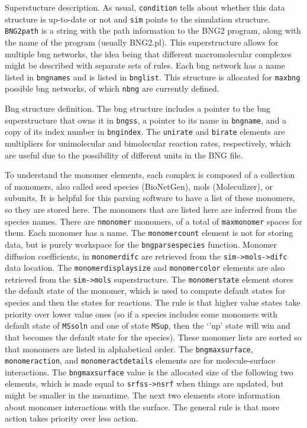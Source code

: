 \documentclass {scrbook}
\newcommand {\ttt} {\texttt}
\begin{document}
Superstucture description. As usual, \ttt{condition} tells about whether this data structure is up-to-date or not and \ttt{sim} points to the simulation structure. \ttt{BNG2path} is a string with the path information to the BNG2 program, along with the name of the program (usually BNG2.pl). This superstructure allows for multiple bng networks, the idea being that different macromolecular complexes might be described with separate sets of rules. Each bng network has a name listed in \ttt{bngnames} and is listed in \ttt{bnglist}. This structure is allocated for \ttt{maxbng} possible bng networks, of which \ttt{nbng} are currently defined.

Bng structure definition. The bng structure includes a pointer to the bng superstructure that owns it in \ttt{bngss}, a pointer to its name in \ttt{bngname}, and a copy of its index number in \ttt{bngindex}. The \ttt{unirate} and \ttt{birate} elements are multipliers for unimolecular and bimolecular reaction rates, respectively, which are useful due to the possibility of different units in the BNG file.

To understand the monomer elements, each complex is composed of a collection of monomers, also called seed species (BioNetGen), mols (Moleculizer), or subunits. It is helpful for this parsing software to have a list of these monomers, so they are stored here. The monomers that are listed here are inferred from the species names. There are \ttt{nmonomer} monomers, of a total of \ttt{maxmonomer} spaces for them. Each monomer has a name. The \ttt{monomercount} element is not for storing data, but is purely workspace for the \ttt{bngparsespecies} function. Monomer diffusion coefficients, in \ttt{monomerdifc} are retrieved from the \ttt{sim->mols->difc} data location. The \ttt{monomerdisplaysize} and \ttt{monomercolor} elements are also retrieved from the \ttt{sim->mols} superstructure. The \ttt{monomerstate} element stores the default state of the monomer, which is used to compute default states for species and then the states for reactions. The rule is that higher value states take priority over lower value ones (so if a species includes some monomers with default state of \ttt{MSsoln} and one of state \ttt{MSup}, then the `'up' state will win and that becomes the default state for the species). These monomer lists are sorted so that monomers are listed in alphabetical order. The \ttt{bngmaxsurface}, \ttt{monomeraction}, and \ttt{monomeractdetails} elements are for molecule-surface interactions. The \ttt{bngmaxsurface} value is the allocated size of the following two elements, which is made equal to \ttt{srfss->nsrf} when things are updated, but might be smaller in the meantime. The next two elements store information about monomer interactions with the surface. The general rule is that more action takes priority over less action.
\end{document}
